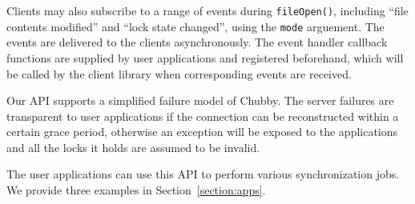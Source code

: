Clients may also subscribe to a range of events during \texttt{fileOpen()},
including ``file contents modified'' and ``lock state changed'',
using the \texttt{mode} arguement.
The events are delivered to the clients asynchronously.
The event handler callback functions are supplied by user applications and
registered beforehand, which will be called by the client library when
corresponding events are received.

Our API supports a simplified failure model of Chubby. The server failures
are transparent to user applications if the connection can be reconstructed
within a certain grace period, otherwise an exception will be exposed to
the applications and all the locks it holds are assumed to be invalid.

The user applications can use this API to perform various synchronization
jobs. We provide three examples in Section~\ref{section:apps}.


